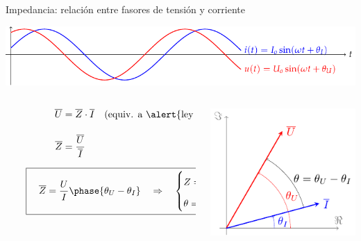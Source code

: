 \documentclass[aspectratio=169, usenames,svgnames,dvipsnames]{beamer}
\begin{document}
\begin{frame}{Impedancia: \hspace{3mm}relación entre fasores de tensión y corriente}
    \vspace{2mm}
    \begin{center}
        \includegraphics[width=.9\linewidth]{../figs/ondasTensionCorriente.pdf}
    \end{center}

    \vspace{-7mm}
    \begin{columns}
    \begin{column}{0.5\columnwidth}

        \vspace{3mm} 
        \begin{align*}
          \qquad\qquad\quad \overline{U} &= \overline{Z} \cdot \overline{I} \quad \text{(equiv. a \alert{ley de Ohm})}\\[10pt] 
          \qquad\qquad\quad \overline{Z} &= \frac{\overline{U}}{\overline{I}}
        \end{align*}

        \vspace{-6mm} 
        \[
        \qquad \boxed{\quad \overline{Z} = \frac{U}{I}\phase{\theta_U - \theta_I} \quad \Rightarrow \quad
            \begin{cases}
              Z = \dfrac{U}{I}\\[8pt]
              \theta = \theta_U - \theta_I
            \end{cases}}
        \]
    \end{column}    
    \begin{column}{0.5\columnwidth}
        \begin{center}
            \includegraphics[height=0.6\textheight]{../figs/fasorTensionCorriente.pdf}
        \end{center}
    \end{column}
    \end{columns}
\end{frame}
\end{document}
